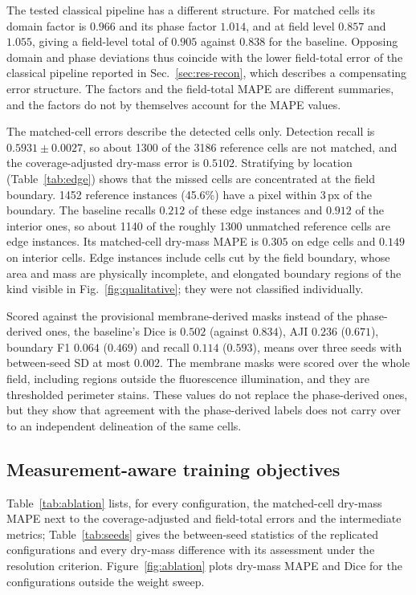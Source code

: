 \documentclass[11pt]{article}
\begin{document}
The tested classical pipeline has a different structure. For matched cells its
domain factor is $0.966$ and its phase factor $1.014$, and at field level
$0.857$ and $1.055$, giving a field-level total of $0.905$ against $0.838$ for
the baseline. Opposing domain and phase deviations thus coincide with the lower
field-total error of the classical pipeline reported in
Sec.~\ref{sec:res-recon}, which describes a compensating error structure. The
factors and the field-total MAPE are different summaries, and the factors do
not by themselves account for the MAPE values.



The matched-cell errors describe the detected cells only. Detection recall is
$0.5931\pm0.0027$, so about 1300 of the 3186 reference cells are not matched,
and the coverage-adjusted dry-mass error is $0.5102$. Stratifying by location
(Table~\ref{tab:edge}) shows that the missed cells are concentrated at the field
boundary. 1452 reference instances (45.6\%) have a pixel within 3\,px of the
boundary. The baseline recalls $0.212$ of these edge instances and $0.912$ of
the interior ones, so about 1140 of the roughly 1300 unmatched reference cells
are edge instances. Its matched-cell dry-mass MAPE is $0.305$ on edge cells and
$0.149$ on interior cells. Edge instances include cells cut by the field
boundary, whose area and mass are physically incomplete, and elongated boundary
regions of the kind visible in Fig.~\ref{fig:qualitative}; they were not
classified individually.



Scored against the provisional membrane-derived masks instead of the
phase-derived ones, the baseline's Dice is $0.502$ (against $0.834$), AJI
$0.236$ ($0.671$), boundary F1 $0.064$ ($0.469$) and recall $0.114$ ($0.593$),
means over three seeds with between-seed SD at most $0.002$. The membrane masks
were scored over the whole field, including regions outside the fluorescence
illumination, and they are thresholded perimeter stains. These values do not
replace the phase-derived ones, but they show that agreement with the
phase-derived labels does not carry over to an independent delineation of the
same cells.

\subsection{Measurement-aware training objectives}
\label{sec:res-mawo}

Table~\ref{tab:ablation} lists, for every configuration, the matched-cell
dry-mass MAPE next to the coverage-adjusted and field-total errors and the
intermediate metrics; Table~\ref{tab:seeds} gives the between-seed statistics
of the replicated configurations and every dry-mass difference with its
assessment under the resolution criterion. Figure~\ref{fig:ablation} plots dry-mass MAPE and Dice for
the configurations outside the weight sweep.
\end{document}
